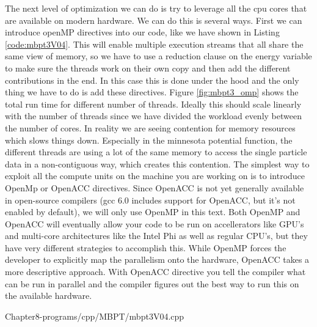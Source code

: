 The next level of optimization we can do is try to leverage all the cpu
cores that are available on modern hardware. We can do this is several
ways. First we can introduce openMP directives into our code, like we
have shown in Listing \ref{code:mbpt3V04}. This will enable multiple execution streams
that all share the same view of memory, so we have to use a reduction
clause on the energy variable to make sure the threads work on their own
copy and then add the different contributions in the end. In this case
this is done under the hood and the only thing we have to do is add
these directives. Figure \ref{fig:mbpt3_omp} shows the total run time for different
number of threads. Ideally this should scale linearly with the number of
threads since we have divided the workload evenly between the number of
cores. In reality we are seeing contention for memory resources which
slows things down. Especially in the minnesota potential function, the
different threads are using a lot of the same memory to access the
single particle data in a non-contiguous way, which creates this
contention.
The simplest way to exploit all the compute units on the machine you are
working on is to introduce OpenMp or OpenACC directives. Since OpenACC
is not yet generally available in open-source compilers (gcc 6.0
includes support for OpenACC, but it's not enabled by default), we will
only use OpenMP in this text. Both OpenMP and OpenACC will eventually
allow your code to be run on accellerators like GPU's and multi-core
architectures like the Intel Phi as well as regular CPU's, but they have
very different strategies to accomplish this. While OpenMP forces the
developer to explicitly map the parallelism onto the hardware, OpenACC
takes a more descriptive approach. With OpenACC directive you tell the
compiler what can be run in parallel and the compiler figures out the
best way to run this on the available hardware.
        

{Chapter8-programs/cpp/MBPT/mbpt3V04.cpp}

